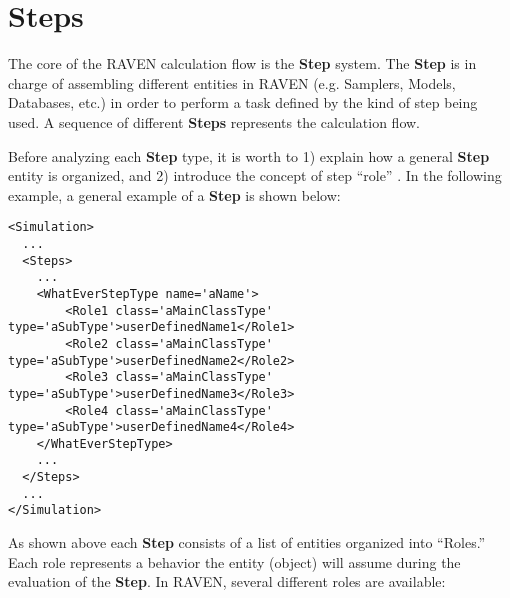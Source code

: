\section{Steps}
\label{sec:steps}
The core of the RAVEN calculation flow is the \textbf{Step} system.
%
The \textbf{Step} is in charge of assembling different entities in RAVEN (e.g.
Samplers, Models, Databases, etc.) in order to perform a task defined by the
kind of step being used.
%
A sequence of different \textbf{Steps} represents the calculation flow.
%

Before analyzing each \textbf{Step} type, it is worth to 1) 
explain how a general \textbf{Step} entity is organized, and 2) introduce the concept of step
``role'' .
%
In the following example, a general example of a \textbf{Step} is shown below:
\begin{lstlisting}[style=XML,morekeywords={class}]
<Simulation>
  ...
  <Steps>
    ...
    <WhatEverStepType name='aName'>
        <Role1 class='aMainClassType' type='aSubType'>userDefinedName1</Role1>
        <Role2 class='aMainClassType' type='aSubType'>userDefinedName2</Role2>
        <Role3 class='aMainClassType' type='aSubType'>userDefinedName3</Role3>
        <Role4 class='aMainClassType' type='aSubType'>userDefinedName4</Role4>
    </WhatEverStepType>
    ...
  </Steps>
  ...
</Simulation>
\end{lstlisting}
As shown above each \textbf{Step} consists of
a list of entities organized into ``Roles.'' 
%
Each role represents a behavior the entity (object) will assume during the
evaluation of the \textbf{Step}.
%
In RAVEN, several different roles are available:
